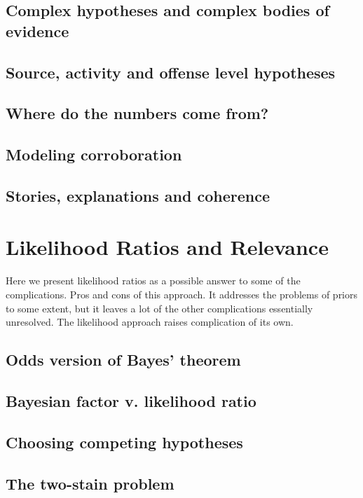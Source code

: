 \documentclass[]{book}
\begin{document}
\section{Complex hypotheses and complex bodies of evidence}

\section{Source, activity and offense level hypotheses}

\section{Where do the numbers come from?}

\section{Modeling corroboration}

\section{Stories, explanations and coherence}

\chapter{Likelihood Ratios and Relevance}

Here we present likelihood ratios as a possible
answer to some of the complications. Pros and cons
of this approach. It addresses
the problems of priors to some extent,
but it leaves a lot of the other complications essentially unresolved.
The likelihood approach raises
complication of its own.

\section{Odds version of Bayes' theorem}

\section{Bayesian factor v. likelihood ratio}

\section{Choosing competing hypotheses}

\section{The two-stain problem}
\end{document}

